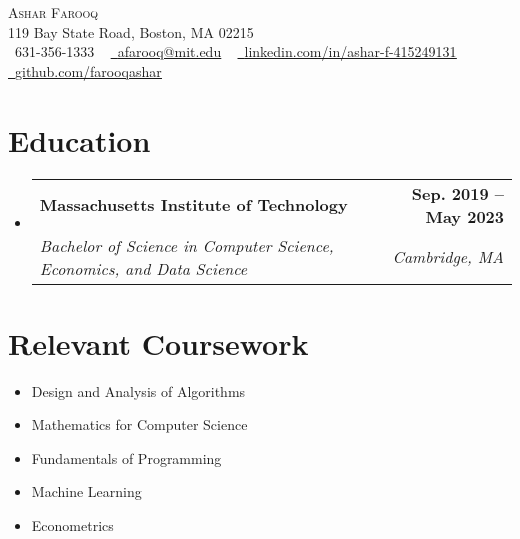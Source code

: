 \documentclass[letterpaper,11pt]{article}
\makeatletter
\newcommand{\resumeSubheading}[4]{
  \vspace{-2pt}\item
    \begin{tabular*}{1.0\textwidth}[t]{l@{\extracolsep{\fill}}r}
      \textbf{#1} & \textbf{\small #2} \\
      \textit{\small#3} & \textit{\small #4} \\
    \end{tabular*}\vspace{-7pt}
}
\newcommand{\resumeSubHeadingListStart}{\begin{itemize}[leftmargin=0.0in, label={}]}
\newcommand{\resumeSubHeadingListEnd}{\end{itemize}}
\makeatother
\begin{document}

\begin{center}
    {\Huge \scshape Ashar Farooq} \\ \vspace{1pt}
    119 Bay State Road, Boston, MA 02215 \\ \vspace{1pt}
    \small \raisebox{-0.1\height}\faPhone\ 631-356-1333 ~ \href{mailto:afarooq@mit.edu}{\raisebox{-0.2\height}\faEnvelope\  \underline{afarooq@mit.edu}} ~ 
    \href{https://linkedin.com/in/ashar-f-415249131/}{\raisebox{-0.2\height}\faLinkedin\ \underline{linkedin.com/in/ashar-f-415249131}}  ~
    \href{https://github.com/farooqashar}{\raisebox{-0.2\height}\faGithub\ \underline{github.com/farooqashar}}
    \vspace{-8pt}
\end{center}


\section{Education}
  \resumeSubHeadingListStart
    \resumeSubheading
      {Massachusetts Institute of Technology}{Sep. 2019 -- May 2023}
      {Bachelor of Science in Computer Science, Economics, and Data Science}{Cambridge, MA}
  \resumeSubHeadingListEnd

\section{Relevant Coursework}
        \begin{multicols}{4}
            \begin{itemize}[itemsep=-5pt, parsep=3pt]
                \item Design and Analysis of Algorithms
                \item Mathematics for Computer Science
                \item Fundamentals of Programming
                \item Machine Learning
                \item Econometrics 
            \end{itemize}
        \end{multicols}
        \vspace*{2.0\multicolsep}
\end{document}

